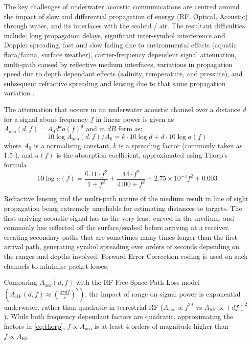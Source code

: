 \documentclass{aamas2016}
\begin{document}
The key challenges of underwater acoustic communications are centred around the impact of slow and differential propagation of energy (RF, Optical, Acoustic) through water, and its interfaces with the seabed / air.
The resultant difficulties include; long propagation delays, significant inter-symbol interference and Doppler spreading, fast and slow fading due to environmental effects (aquatic flora/fauna, surface weather), carrier-frequency dependent signal attenuation, multi-path caused by reflective medium interfaces, variations in propagation speed due to depth dependant effects (salinity, temperature, and pressure), and subsequent refractive spreading and lensing due to that same propagation variation \cite{Partan2006}.

The attenuation that occurs in an underwater acoustic channel over a distance $d$ for a signal about frequency $f$ in linear power is given as $A_{\text{aco}}(d,f) = A_0d^ka(f)^d$ and in $dB$ form as;
%
\begin{equation}
\label{eq:acoattenuationdb}
10 \log A_{\text{aco}}(d,f)/A_0 = k \cdot 10 \log d + d \cdot 10 \log a(f)
\end{equation}
%
where $A_0$ is a normalising constant, $k$ is a spreading factor (commonly taken as 1.5  \cite{Stojanovic2007}), and $a(f)$ is the absorption coefficient, approximated using Thorp's formula \cite{Stefanov2011}
%
\begin{equation}
\label{eq:thorp}
10 \log a(f) = \frac{0.11 \cdot f^2}{1+f^2} + \frac{44\cdot f^2}{4100+f^2}+ 2.75\times10^{-4} f^2 + 0.003
\end{equation}
%

Refractive lensing and the multi-path nature of the medium result in line of sight propagation being extremely unreliable for estimating distances to targets.
The first arriving acoustic signal has as the very least curved in the medium, and commonly has reflected off the surface/seabed before arriving at a receiver, creating secondary paths that are sometimes many times longer than the first arrival path, generating symbol spreading over orders of seconds depending on the ranges and depths involved.
Forward Error Correction coding is used on such channels to minimise packet losses.

Comparing $A_{aco}(d,f)$ with the RF Free-Space Path Loss model $(A_{\text{RF}}(d,f) \approx \left( \frac{4\pi d f}{c} \right)^2)$, the impact of range on signal power is exponential underwater, rather than quadratic in terrestrial RF ($A_{\text{aco}} \propto f^{2d}$ vs $A_{\text{RF}} \propto (df)^2$). 
While both frequency dependant factors are quadratic, approximating the factors in \eqref{eq:thorp}, $f\propto A_{\text{aco}}$ is at least 4 orders of magnitude higher than $f\propto A_{\text{RF}}$
\end{document}
